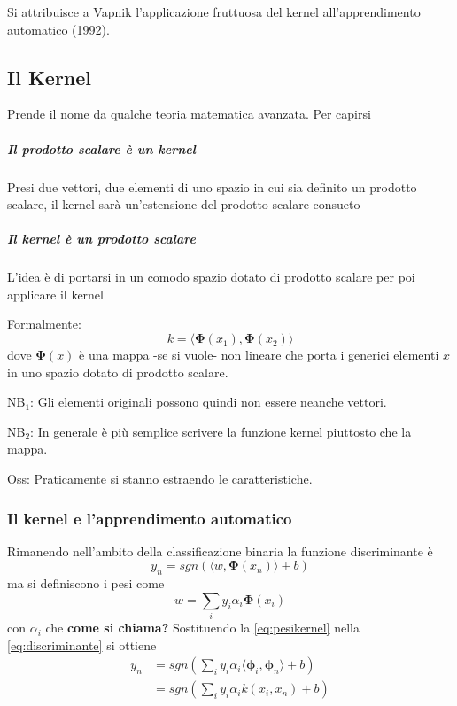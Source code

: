 Si attribuisce a Vapnik l'applicazione fruttuosa
del kernel all'apprendimento automatico (1992).

\subsection{Il Kernel}
Prende il nome da qualche teoria matematica avanzata.
Per capirsi
\subparagraph{Il prodotto scalare \`e un kernel} Presi due vettori, due elementi di uno spazio
in cui sia definito un prodotto scalare,
il kernel sar\`a un'estensione del prodotto scalare consueto
\subparagraph{Il kernel \`e un prodotto scalare} L'idea è
di portarsi in un comodo spazio dotato di prodotto scalare
per poi applicare il kernel


Formalmente:
\begin {equation}
  \label {eq:kernel}
  k = \langle \mathbf{\Phi}(x_1), \mathbf{\Phi}(x_2) \rangle
\end{equation}
dove $\mathbf{\Phi}(x)$ \`e una mappa -se si vuole- non lineare
che porta i generici elementi $x$
in uno spazio dotato di prodotto scalare.

NB$_{1}$: Gli elementi originali possono quindi non essere neanche vettori.\par
NB$_{2}$: In generale \`e pi\`u semplice scrivere la funzione kernel piuttosto che la mappa.\par
Oss: Praticamente si stanno estraendo le caratteristiche.\par

\subsubsection{Il kernel e l'apprendimento automatico}
Rimanendo nell'ambito della classificazione binaria
la funzione discriminante \`e
\begin{equation}
	\label{eq:discriminante}
	y_n = sgn \left(\langle w, \mathbf{\Phi}(x_n) \rangle + b \right)
\end{equation}
ma si definiscono i pesi come
\begin{equation}
  \label{eq:pesikernel}
  w = \sum_i y_i \alpha_i \mathbf{\Phi}(x_i)
\end{equation}
con $\alpha_i$ che \textbf{come si chiama?}
Sostituendo la \ref{eq:pesikernel} nella \ref{eq:discriminante}
si ottiene
\begin{align}
  y_n &= sgn \left(\sum_i y_i \alpha_i \langle \mathbf{\mathbf{\phi}}_i,\mathbf{\mathbf{\phi}}_n \rangle + b \right) \\
  &= sgn \left(\sum_i y_i \alpha_i k(x_i,x_n) + b \right)
  \label{eq:uscitakernel}
\end{align}

